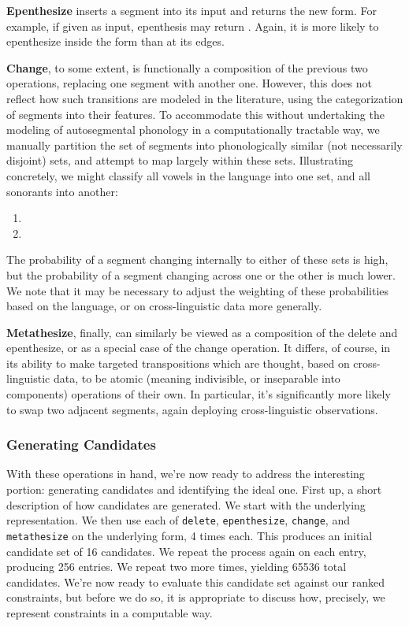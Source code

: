 \documentclass[12pt]{article}
\begin{document}
\textbf{Epenthesize} inserts a segment into its input and returns the new form.
For example, if given \textipa{[sol\'u]} as input, epenthesis may return
\textipa{[sool\'u]}. Again, it is more likely to epenthesize inside the form
than at its edges.

\textbf{Change}, to some extent, is functionally a composition of the previous
two operations, replacing one segment with another one. However, this does not
reflect how such transitions are modeled in the literature, using the
categorization of segments into their features. To accommodate this without
undertaking the modeling of autosegmental phonology
\cite{goldsmith1990autosegmental} in a computationally tractable way, we
manually partition the set of segments into phonologically similar (not
necessarily disjoint) sets, and attempt to map largely within these sets.
Illustrating concretely, we might classify all vowels in the language into one
set, and all sonorants into another:

\begin{enumerate}
    \item {}
    \item {}
\end{enumerate}

The probability of a segment changing internally to either of these sets is
high, but the probability of a segment changing across one or the other is much
lower. We note that it may be necessary to adjust the weighting of these
probabilities based on the language, or on cross-linguistic data more generally.

\textbf{Metathesize}, finally, can similarly be viewed as a composition of the
delete and epenthesize, or as a special case of the change operation. It
differs, of course, in its ability to make targeted transpositions which are
thought, based on cross-linguistic data, to be atomic (meaning indivisible, or
inseparable into components) operations of their own. In particular, it's
significantly more likely to swap two adjacent segments, again deploying
cross-linguistic observations.

\subsubsection{Generating Candidates}

With these operations in hand, we're now ready to address the interesting
portion: generating candidates and identifying the ideal one. First up, a short
description of how candidates are generated. We start with the underlying
representation. We then use each of \texttt{delete}, \texttt{epenthesize},
\texttt{change}, and \texttt{metathesize} on the underlying form, 4 times each.
This produces an initial candidate set of 16 candidates. We repeat the process
again on each entry, producing 256 entries. We repeat two more times, yielding
65536 total candidates. We're now ready to evaluate this candidate set against
our ranked constraints, but before we do so, it is appropriate to discuss how,
precisely, we represent constraints in a computable way.
\end{document}
